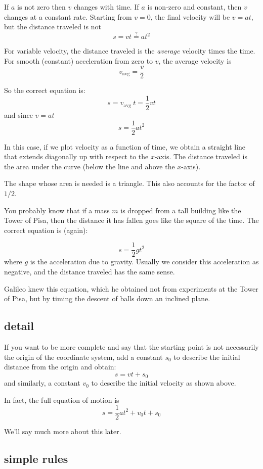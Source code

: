 \documentclass[11pt, oneside]{article}
\begin{document}
If $a$ is not zero then $v$ changes with time.  If $a$ is non-zero and constant, then $v$ changes at a constant rate.  Starting from $v=0$, the final velocity will be $v = at$, but the distance traveled is not 
\[ s = vt \stackrel{?}{=} at^2 \]

For variable velocity, the distance traveled is the \emph{average} velocity times the time.  For smooth (constant) acceleration from zero to $v$, the average velocity is
\[ v_{\text{avg}} = \frac{v}{2} \]

So the correct equation is:
\[ s = v_{\text{avg}}\ t  = \frac{1}{2} v t \]
and since $v = at$
\[ s = \frac{1}{2} at^2 \]

In this case, if we plot velocity as a function of time, we obtain a straight line that extends diagonally up with respect to the $x$-axis.  The distance traveled is the area under the curve (below the line and above the $x$-axis).  

The shape whose area is needed is a triangle.  This also accounts for the factor of $1/2$.

You probably know that if a mass $m$ is dropped from a tall building like the Tower of Pisa, then the distance it has fallen goes like the square of the time.  The correct equation is (again):

\[ s = \frac{1}{2} g t^2 \]
where $g$ is the acceleration due to gravity.  Usually we consider this acceleration as negative, and the distance traveled has the same sense.

Galileo knew this equation, which he obtained not from experiments at the Tower of Pisa, but by timing the descent of balls down an inclined plane.

\subsection*{detail}

If you want to be more complete and say that the starting point is not necessarily the origin of the coordinate system, add a constant $s_0$ to describe the initial distance from the origin and obtain:
\[ s = vt + s_0 \]
and similarly, a constant $v_0$ to describe the initial velocity as shown above.

In fact, the full equation of motion is 
\[ s = \frac{1}{2} a t^2 + v_0 t + s_0 \]

We'll say much more about this later.

\subsection*{simple rules}
\end{document}

